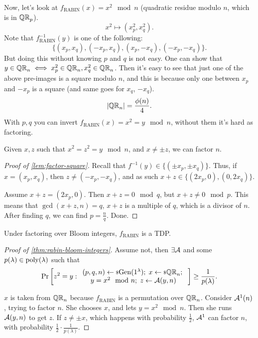 Now, let's look at $f_{\mathrm{RABIN}}(x) = x^2 \mod n$ (quadratic residue modulo $n$, which is in $\QR$).
\begin{equation*}
	x^2 \mapsto (x_p^2, x_q^2).
\end{equation*}
Note that $f_{\mathrm{RABIN}}^{-1}(y)$ is one of the following:
\begin{equation*}
	\{ (x_p, x_q), (-x_p, x_q), (x_p, -x_q), (-x_p, -x_q) \}.
\end{equation*}
But doing this without knowing $p$ and $q$ is not easy.
One can show that $y \in \QR[n] \iff x^2_p \in \QR[n], x^2_q \in \QR[n]$.
Then it's easy to see that just one of the above pre-images is a square modulo $n$, and this is because only one between $x_p$ and $-x_p$ is a square (and same goes for $x_q$, $-x_q$).
\begin{equation*}
	\abs{\QR[n]} = \frac{\phi(n)}{4}.
\end{equation*}
With $p, q$ you can invert $f_{\mathrm{RABIN}}(x) = x^2 = y \mod n$, without them it's hard as factoring.

\begin{lemma} \label{lem:factor-square}
	Given $x, z$ such that $x^2 = z^2 = y \mod n$, and $x \neq \pm z$, we can factor $n$.
\end{lemma}

\begin{proof}[Proof of \cref{lem:factor-square}]
	Recall that $f^{-1}(y) \in \{ (\pm x_p, \pm x_q) \}$.
	Thus, if $x = (x_p, x_q)$, then $z \neq (-x_p, -x_q)$, and as such $x+z \in \{ (2x_p, 0), (0, 2x_q)\}$.

	Assume $x+z = (2x_p, 0)$.
	Then $x+z = 0 \mod q$, but $x+z \neq 0 \mod p$.
	This means that $\gcd(x+z,n) = q$, \ie $x+z$ is a multiple of $q$, which is a divisor of $n$.
	After finding $q$, we can find $p = \frac{n}{q}$.
	Done.
\end{proof}

\begin{theorem} \label{thm:rabin-bloom-integers}
	Under factoring over Bloom integers, $f_{\mathrm{RABIN}}$ is a \ac{TDP}.
\end{theorem}

\begin{proof}[Proof of \cref{thm:rabin-bloom-integers}]
	Assume not, then $\exists \Adv$ and some $p(\lambda) \in \poly(\lambda)$ such that
	\begin{equation*}
		\Pr{
			z^2 = y :
			\begin{array}{c}
			(p, q, n) \rand{\Gen(1^{\lambda})}; \;
			x \rand{\QR[n]}; \; \\
			y = x^2 \mod n; \;
			z \from \Adv(y, n)
			\end{array}
		}
		\ge \frac{1}{p(\lambda)}.
	\end{equation*}

	$x$ is taken from $\QR[n]$ because $f_{\mathrm{RABIN}}$ is a permutation over $\QR[n]$.
	Consider $\Adv^1(n)$, trying to factor $n$.
	She chooses $x$, and lets $y = x^2 \mod n$.
	Then she runs $\Adv(y, n)$ to get $z$.
	If $z \neq \pm x$, which happens with probability $\frac{1}{2}$, $\Adv^1$ can factor $n$, with probability $\frac{1}{2} \cdot \frac{1}{p(\lambda)}$.
\end{proof}

